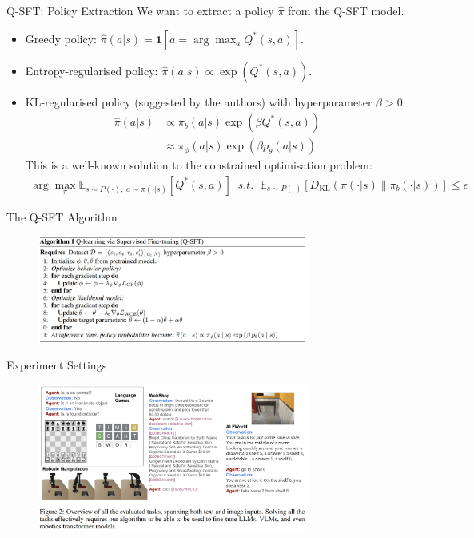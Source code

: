 \documentclass[aspectratio=169]{beamer}
\begin{document}
\begin{frame}{Q-SFT: Policy Extraction}
    We want to extract a policy $\hat{\pi}$ from the Q-SFT model.
    \begin{itemize}[<+->]
        \item Greedy policy: $\hat{\pi}(a|s) = \mathbf{1}[a = \arg \max_a Q^*(s,a)]$.
        \item Entropy-regularised policy: $\hat{\pi}(a|s) \propto \exp(Q^*(s,a))$.
        \item KL-regularised policy (suggested by the authors) with hyperparameter $\beta > 0$: 
        $$\begin{aligned}
            \hat{\pi}(a|s) &\propto \pi_b(a|s) \exp(\beta Q^*(s,a)) \\ &\approx \pi_\phi(a|s) \exp(\beta p_\theta(a|s))
        \end{aligned}$$
        This is a well-known solution to the constrained optimisation problem:
        $$\begin{aligned}
            \arg \max_{\pi} \mathbb{E}_{s\sim P(\cdot), \; a\sim \pi(\cdot|s)}\left[Q^*(s,a)\right] \;\; s.t. \;\;
            \mathbb{E}_{s \sim P(\cdot)}\left[D_{\text{KL}}(\pi(\cdot|s) \parallel \pi_b(\cdot|s))\right] \leq \epsilon
        \end{aligned}
        $$
    \end{itemize}
\end{frame}

\begin{frame}{The Q-SFT Algorithm}
    \begin{figure}
        \includegraphics[width=0.8\textwidth]{img/Q-SFT algo.png}
    \end{figure}
\end{frame}

\begin{frame}{Experiment Settings}
    \begin{figure}
        \includegraphics[width=0.8\textwidth]{img/Q-SFT tasks.png}
    \end{figure}
\end{frame}
\end{document}
